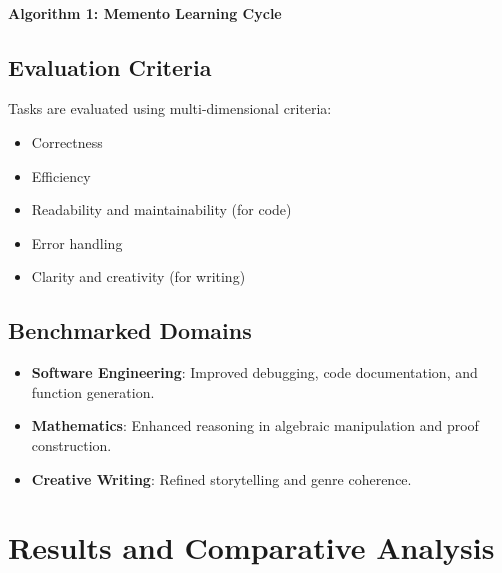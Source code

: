 \documentclass[10pt,a4paper,twocolumn]{article}
\begin{document}
\paragraph{Algorithm 1: Memento Learning Cycle}




\subsection{Evaluation Criteria}


 Tasks are evaluated using multi-dimensional criteria:

\begin{itemize}
    \item Correctness
    \item Efficiency
    \item Readability and maintainability (for code)
    \item Error handling
    \item Clarity and creativity (for writing)



\end{itemize}



\subsection{Benchmarked Domains}



\begin{itemize}
    \item \textbf{Software Engineering}: Improved debugging, code documentation, and function generation.
    \item \textbf{Mathematics}: Enhanced reasoning in algebraic manipulation and proof construction.
    \item \textbf{Creative Writing}: Refined storytelling and genre coherence.
\end{itemize}





\section{{\textbf{Results and Comparative Analysis} } }
\end{document}
